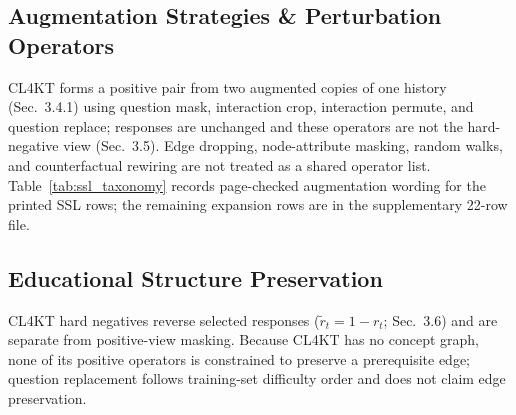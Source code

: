 \documentclass[lettersize,journal]{IEEEtran}
\begin{document}
\subsection{Augmentation Strategies \& Perturbation Operators}
CL4KT \cite{KT039_CL4KT_2022} forms a positive pair from two augmented copies of one history (Sec.~3.4.1) using question mask, interaction crop, interaction permute, and question replace; responses are unchanged and these operators are not the hard-negative view (Sec.~3.5). Edge dropping, node-attribute masking, random walks, and counterfactual rewiring are not treated as a shared operator list. Table~\ref{tab:ssl_taxonomy} records page-checked augmentation wording for the printed SSL rows; the remaining expansion rows are in the supplementary 22-row file.

\subsection{Educational Structure Preservation}
CL4KT hard negatives reverse selected responses ($\tilde{r}_t = 1 - r_t$; Sec.~3.6) and are separate from positive-view masking. Because CL4KT has no concept graph, none of its positive operators is constrained to preserve a prerequisite edge; question replacement follows training-set difficulty order and does not claim edge preservation.
\end{document}
